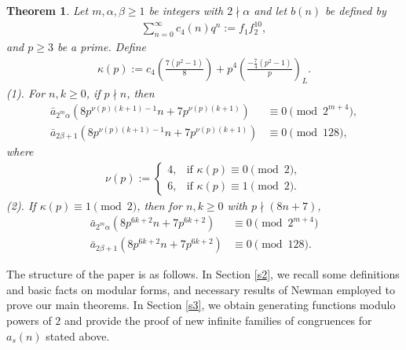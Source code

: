 \documentclass[11pt,a4paper]{article}
\numberwithin{equation}{section}
\theoremstyle{plain}
\newtheorem{theorem}{Theorem}[section]
\begin{document}
	\begin{theorem}\label{t8n7}
	Let $m,\alpha,\beta \ge1$ be integers with $2\nmid \alpha$ and let $b(n)$ be defined by
	\begin{align}\label{e1.1}
		\sum_{n=0}^{\infty}c_4(n)q^n:= f_1 f_2^{10},
	\end{align}
	and $p\ge 3$ be a prime. Define
	\begin{align}\label{e1.2}
		\kappa(p):= c_4\displaystyle\left(\frac{7(p^2-1)}{8}\right) + p^4\displaystyle\left(\frac{-\frac{7}{4}(p^2-1)}{p}\right)_L.
	\end{align}
	(1). For $n,k\ge0$, if $p\nmid n$, then
	\begin{align}\label{e1.3}
		\bar{a}_{2^m\alpha}\displaystyle\left(8p^{\nu(p)(k+1)-1}n + 7p^{\nu(p)(k+1)}\right) &\equiv0\pmod{2^{m+4}},\\
		\bar{a}_{2\beta+1}\left(8p^{\nu(p)(k+1)-1}n + 7p^{\nu(p)(k+1)}\right)&\equiv 0\pmod {128},
	\end{align}
	where
	\begin{align}\label{e1.4}
		\nu(p) :=\begin{cases}
			4, & \text{if } \kappa(p) \equiv 0\pmod 2,\\[4pt]
			6, & \text{if } \kappa(p) \equiv 1\pmod2.
		\end{cases}
	\end{align}
	(2). If $\kappa(p)\equiv1\pmod2$, then for $n,k\ge0$ with $p\nmid (8n+7)$,
	\begin{align}\label{e1.5}
		\bar{a}_{2^m\alpha}\displaystyle\left(8p^{6k+2}n + 7p^{6k+2}\right) &\equiv0\pmod {2^{m+4}}\\
		\bar{a}_{2\beta+1}\left(8p^{6k+2}n + 7p^{6k+2}\right)&\equiv 0\pmod {128}.
	\end{align}
\end{theorem}

The structure of the paper is as follows. In Section \ref{s2}, we recall some definitions and basic facts on modular forms, and necessary results of Newman employed to prove our main theorems. In Section \ref{s3}, we obtain generating functions modulo powers of $2$ and provide the proof of new infinite families of congruences for $a_s(n)$ stated above. 
\end{document}
